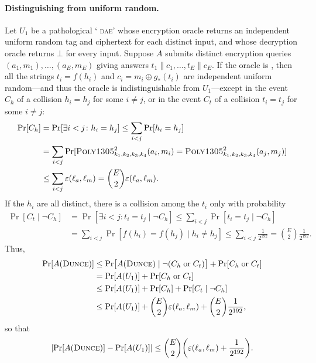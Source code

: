 \documentclass{article}
\def\operatorsc#1{{%
  \ifmmode\let\next=\operatorname\else\let\next=\relax\fi\next{\textsc{#1}}}}
\def\Poly#1/{\operatorsc{Poly#1}}
\def\DUNCE/{\operatorsc{Dunce}}
\def\DAE{%
  \ifmmode\def\next{\operatorname{DAE}}%
    \else\def\next/{\textsc{dae}}%
  \fi\next}
\newcommand{\concat}{\mathbin\|}
\newcommand{\given}{\mathrel|}
\newcommand{\collisionbound}{\varepsilon}
\begin{document}
\paragraph*{Distinguishing \DUNCE/ from uniform random.}
Let $U_1$ be a pathological `\DAE/' whose encryption oracle returns an
 independent uniform random tag and ciphertext for each distinct
 input, and whose decryption oracle returns $\bot$ for every input.
Suppose $A$ submits distinct encryption queries
 $(a_1, m_1), \dotsc, (a_E, m_E)$
 giving answers
 $t_1 \concat c_1, \dotsc, t_E \concat c_E$.
If the oracle is \DUNCE/, then all the strings $t_i = f(h_i)$ and
 $c_i = m_i \oplus g_*(t_i)$ are independent uniform random---and thus
 the oracle is indistinguishable from $U_1$---except in the event
 $C_h$ of a collision $h_i = h_j$ for some $i \ne j$, or in the event
 $C_t$ of a collision $t_i = t_j$ for some $i \ne j$:
%
\begin{align*}
  \Pr[C_h]
    &= \Pr[\exists i<j\colon h_i = h_j]
     \leq \sum_{i<j} \Pr[h_i = h_j] \\
    &= \sum_{i<j}
         \Pr[\Poly1305/^2_{k_1,k_2,k_3,k_4}(a_i, m_i)
               = \Poly1305/^2_{k_1,k_2,k_3,k_4}(a_j, m_j)] \\
    &\leq \sum_{i<j} \collisionbound(\ell_a, \ell_m)
     = \binom{E}{2} \collisionbound(\ell_a, \ell_m).
\end{align*}
%
If the $h_i$ are all distinct, there is a collision among the $t_i$
 only with probability
%
\begin{align*}
  \Pr[C_t \given \lnot C_h]
    &= \Pr[\exists i<j\colon t_i = t_j \given \lnot C_h]
     \leq \sum_{i<j} \Pr[t_i = t_j \given \lnot C_h] \\
    &= \sum_{i<j} \Pr[f(h_i) = f(h_j) \given h_i \ne h_j]
     \leq \sum_{i<j} \frac{1}{2^{192}}
     = \binom{E}{2} \frac{1}{2^{192}}.
\end{align*}
%
Thus,
%
\begin{align*}
  \Pr[A(\DUNCE/)]
  &\leq \Pr\bigl[A(\DUNCE/) \given
            \lnot (C_h \mathrel{\text{or}} C_t)\bigr]
        + \Pr[C_h \mathrel{\text{or}} C_t] \\
  &= \Pr[A(U_1)] + \Pr[C_h \mathrel{\text{or}} C_t] \\
  &\leq \Pr[A(U_1)] + \Pr[C_h] + \Pr[C_t \given \lnot C_h] \\
  &\leq \Pr[A(U_1)] + \binom{E}{2} \collisionbound(\ell_a, \ell_m)
        + \binom{E}{2} \frac{1}{2^{192}},
\end{align*}
%
 so that
\[
  \lvert\Pr[A(\DUNCE/)] - \Pr[A(U_1)]\rvert
  \leq \binom{E}{2}
       \biggl(\collisionbound(\ell_a, \ell_m) + \frac{1}{2^{192}}\biggr).
\]
\end{document}
